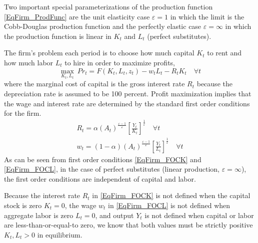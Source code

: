 \documentclass[letterpaper,12pt]{article}
\theoremstyle{definition}
\newcommand\ve{\varepsilon}
\begin{document}
  Two important special parameterizations of the production function \eqref{EqFirm_ProdFunc} are the unit elasticity case $\ve=1$ in which the limit is the Cobb-Douglas production function and the perfectly elastic case $\ve=\infty$ in which the production function is linear in $K_t$ and $L_t$ (perfect substitutes).

  The firm's problem each period is to choose how much capital $K_t$ to rent and how much labor $L_t$ to hire in order to maximize profits,
  \begin{equation}\label{EqFirm_ProfMax}
    \max_{K_t, L_t}\:Pr_t = F(K_t, L_t, z_t) - w_t L_t - R_t K_t \quad\forall t
  \end{equation}
  where the marginal cost of capital is the gross interest rate $R_t$ because the depreciation rate is assumed to be 100 percent. Profit maximization implies that the wage and interest rate are determined by the standard first order conditions for the firm.
  \begin{gather}
    R_t = \alpha(A_t)^\frac{\ve-1}{\ve}\left[\frac{Y_t}{K_t}\right]^\frac{1}{\ve} \quad\forall t \label{EqFirm_FOCK} \\
    w_t = (1 - \alpha)(A_t)^\frac{\ve-1}{\ve}\left[\frac{Y_t}{L_t}\right]^\frac{1}{\ve} \quad\forall t \label{EqFirm_FOCL}
  \end{gather}
  As can be seen from first order conditions \eqref{EqFirm_FOCK} and \eqref{EqFirm_FOCL}, in the case of perfect substitutes (linear production, $\ve=\infty$), the first order conditions are independent of capital and labor.

  Because the interest rate $R_t$ in \eqref{EqFirm_FOCK} is not defined when the capital stock is zero $K_t=0$, the wage $w_t$ in \eqref{EqFirm_FOCL} is not defined when aggregate labor is zero $L_t=0$, and output $Y_t$ is not defined when capital or labor are less-than-or-equal-to zero, we know that both values must be strictly positive $K_t, L_t>0$ in equilibrium.
\end{document}
